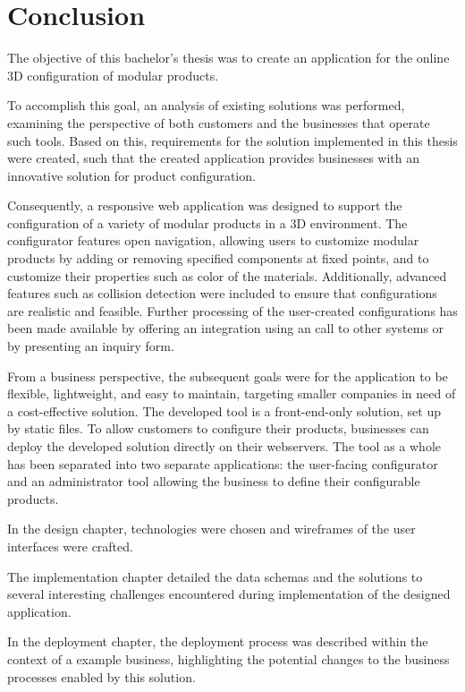 \chapter{Conclusion}

The objective of this bachelor's thesis was to create an application for the online 3D configuration of modular products.

To accomplish this goal, an analysis of existing solutions was performed, examining the perspective of both customers and the businesses that operate such tools. Based on this, requirements for the solution implemented in this thesis were created, such that the created application provides businesses with an innovative solution for product configuration.

Consequently, a responsive web application was designed to support the configuration of a variety of modular products in a 3D environment. The configurator features open navigation, allowing users to customize modular products by adding or removing specified components at fixed points, and to customize their properties such as color of the materials. Additionally, advanced features such as collision detection were included to ensure that configurations are realistic and feasible. Further processing of the user-created configurations has been made available by offering an integration using an  call to other systems or by presenting an inquiry form.

From a business perspective, the subsequent goals were for the application to be flexible, lightweight, and easy to maintain, targeting smaller companies in need of a cost-effective solution. The developed tool is a front-end-only solution, set up by static files. To allow customers to configure their products, businesses can deploy the developed solution directly on their webservers. The tool as a whole has been separated into two separate applications: the user-facing configurator and an administrator tool allowing the business to define their configurable products.

In the design chapter, technologies were chosen and wireframes of the user interfaces were crafted.

The implementation chapter detailed the data schemas and the solutions to several interesting challenges encountered during implementation of the designed application.

In the deployment chapter, the deployment process was described within the context of a example business, highlighting the potential changes to the business processes enabled by this solution.

